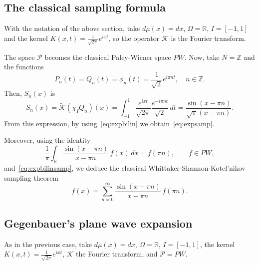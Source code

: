 \documentclass[11pt,a4paper]{amsart}
\theoremstyle{plain}
\theoremstyle{definition}
\newcommand{\Z}{\mathbb{Z}}
\newcommand{\R}{\mathbb{R}}
\newcommand{\calK}{\mathcal{K}}
\newcommand{\calP}{\mathcal{P}}
\begin{document}
\subsection{The classical sampling formula}

With the notation of the above section,
take $d\mu(x) = dx$, $\Omega = \R$, $I = [-1,1]$
and the kernel $K(x,t) = \frac{1}{\sqrt{2\pi}}e^{ixt}$,
so the operator $\calK$ is the Fourier transform.

The space $\calP$ becomes the classical Paley-Wiener space $PW$.
Now, take $N = \Z$ and the functions
\begin{equation*}
  P_{n}(t) = Q_{n}(t) = \phi_{n}(t) = \frac{1}{\sqrt{2}}e^{i\pi nt},
  \quad n \in \Z.
\end{equation*}
Then, $S_{n}(x)$ is
\begin{equation*}
  S_{n}(x) = \widetilde{\calK}(\chi_I\overline{Q_n})(x)
  = \int_{-1}^{1} \frac{e^{ixt}}{\sqrt{2\pi}} \frac{e^{-i\pi nt}}{\sqrt{2}}\,dt
  = \frac{\sin(x-\pi n)}{\sqrt{\pi}(x-\pi n)}.
\end{equation*}
From this expression, by using~\eqref{eq:expbilin} we obtain~\eqref{eq:expsamp}.

Moreover, using the identity
\begin{equation*}
  \frac{1}{\pi} \int_{\R} \frac{\sin(x-\pi n)}{x- \pi n}\,f(x)\,dx
  = f(\pi n),
  \qquad f \in PW,
\end{equation*}
and~\eqref{eq:expbilinsamp}, we deduce the classical
Whittaker-Shannon-Kotel'nikov sampling theorem
\begin{equation*}
  f(x) = \sum_{n=0}^{\infty} \frac{\sin(x- \pi n)}{x-\pi n}\,f(\pi n).
\end{equation*}

\subsection{Gegenbauer's plane wave expansion}

As in the previous case,
take $d\mu(x) = dx$, $\Omega = \R$, $I = [-1,1]$,
the kernel $K(x,t) = \frac{1}{\sqrt{2\pi}}e^{ixt}$,
$\calK$ the Fourier transform, and $\calP = PW$.
\end{document}
